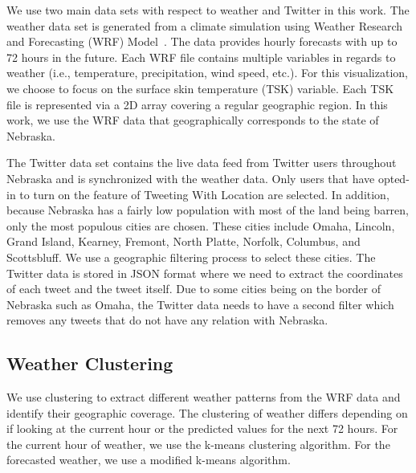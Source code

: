 We use two main data sets with respect to weather and Twitter in this work. The weather data set is generated from a climate simulation using Weather Research and Forecasting (WRF) Model~\cite{Michalakes2004}. %
The data provides hourly forecasts with up to 72 hours in the future. Each WRF file contains multiple variables in regards to weather (i.e., temperature, precipitation, wind speed, etc.). For this visualization, we choose to focus on the surface skin temperature (TSK) variable. Each TSK file is represented via a 2D array %
covering a regular geographic region. In this work, we use the WRF data that geographically corresponds to the state of Nebraska.

The Twitter data set contains the live data feed from Twitter users throughout Nebraska and is synchronized with the weather data. Only users that have opted-in to turn on the feature of Tweeting With Location are selected. In addition, because Nebraska has a fairly low population with most of the land being barren, only the most populous cities are chosen. These cities include Omaha, Lincoln, Grand Island, Kearney, Fremont, North Platte, Norfolk, Columbus, and Scottsbluff. We use a geographic filtering process to select these cities. The Twitter data is stored in JSON format where we need to extract the coordinates of each tweet and the tweet itself. Due to some cities being on the border of Nebraska such as Omaha, the Twitter data needs to have a second filter which removes any tweets that do not have any relation with Nebraska.


\subsection{Weather Clustering}
\label{sec:clust}

We use clustering to extract different weather patterns from the WRF data and identify their geographic coverage. The clustering of weather differs depending on if looking at the current hour or the predicted values for the next 72 hours. For the current hour of weather, we use the k-means clustering algorithm. For the forecasted weather, we use a modified k-means algorithm.



